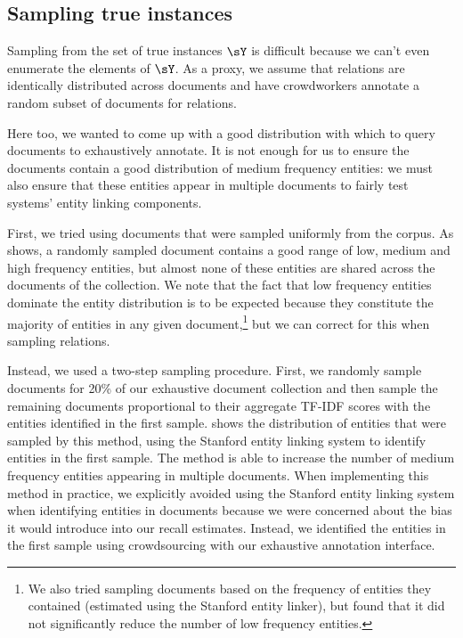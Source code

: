\subsection{Sampling true instances}
Sampling from the set of true instances $\sY$ is difficult because we can't even enumerate the elements of $\sY$.
As a proxy, we assume that relations are identically distributed across documents and have crowdworkers annotate a random subset of documents for relations.

Here too, we wanted to come up with a good distribution with which to query documents to exhaustively annotate.
 It is not enough for us to ensure the documents contain a good distribution of medium frequency entities: we must also ensure that these entities appear in multiple documents to fairly test systems' entity linking components.
 
 First, we tried using documents that were sampled uniformly from the corpus.
 As  shows, 
 a randomly sampled document contains a good range of low, medium and high frequency entities, but almost none of these entities are shared across the documents of the collection.
 We note that the fact that low frequency entities dominate the entity distribution is to be expected because they constitute the majority of entities in any given document,\footnote{%
   We also tried sampling documents based on the frequency of entities they contained (estimated using the Stanford entity linker), but found that it did not significantly reduce the number of low frequency entities.} but we can correct for this when sampling relations.
 
 Instead, we used a two-step sampling procedure.
 First, we randomly sample documents for 20\% of our exhaustive document collection and then sample the remaining documents proportional to their aggregate TF-IDF scores with the entities identified in the first sample.
  shows the distribution of entities that were sampled by this method, using the Stanford entity linking system to identify entities in the first sample.
 The method is able to increase the number of medium frequency entities appearing in multiple documents.
 When implementing this method in practice, we explicitly avoided using the Stanford entity linking system when identifying entities in documents because we were concerned about the bias it would introduce into our recall estimates.
 Instead, we identified the entities in the first sample using crowdsourcing with our exhaustive annotation interface.

